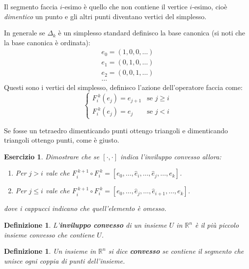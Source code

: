 \documentclass[10pt, twoside=false, x11names]{scrbook}
\newtheorem{definition}[theorem]{Definizione}
\newcounter{exercises}
\newtheorem{exercise}[exercises]{Esercizio}
\newcommand{\RN}[1][]{\mathbb{R}^#1}
\begin{document}
Il segmento faccia $ i $-esimo è quello che non contiene il vertice $ i $-esimo, cioè
\emph{dimentico} un punto e gli altri punti diventano vertici del simplesso.

In generale se $ \Delta_k $ è un simplesso standard definisco la base canonica (si noti
che la base canonica è ordinata):
\begin{gather*}
  e_0 = (1,0,0,\dots)                            \\
  e_1 = (0,1,0,\dots)                            \\
  e_2 = (0,0,1,\dots)                            \\
  \dots
\end{gather*}
Questi sono i vertici del simplesso, definisco l'azione dell'operatore faccia
come:
\[
  \begin{cases}
    F_i^{\; k}(e_j) = e_{j+1}     & \text{se } j \geq i \\
    F_i^{\; k}(e_j) = e_{j} & \text{se } j < i
  \end{cases}
\]

Se fosse un tetraedro dimenticando punti ottengo triangoli e dimenticando
triangoli ottengo punti, come è giusto.

\begin{exercise}
  Dimostrare che se $ [\cdot, \cdot] $ indica l'inviluppo convesso allora:
  \begin{enumerate}
  \item Per $ j > i $ vale che $ F_i^{\; k+1} \circ F_i^{\; k} = [e_0, \dots, \hat{e}_i, \dots, \hat{e}_j, \dots, e_k ] $.
  \item Per $ j \leq i $ vale che $ F_i^{\; k+1} \circ F_i^{\; k} = [e_0, \dots, \hat{e}_j, \dots, \hat{e}_{i+1}, \dots, e_k ] $.
  \end{enumerate}
  dove i cappucci indicano che quell'elemento è omesso.
\end{exercise}

\begin{definition}
  L'\textbf{inviluppo convesso} di un insieme $ U $ in $ \RN{n} $ è il più piccolo
  insieme convesso che contiene $ U $.
\end{definition}
\begin{definition}
  Un insieme in $ \RN{n} $ si dice \textbf{convesso} se contiene
  il segmento che unisce ogni coppia di punti dell'insieme.
\end{definition}
\end{document}
